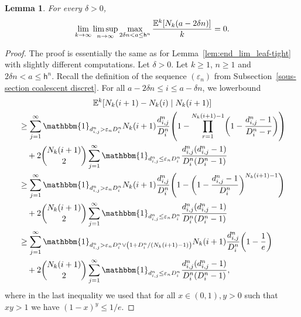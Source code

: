 \documentclass[10pt]{amsart}
\newtheorem{lemm}[theo]{Lemma}\newtheorem{prop}[theo]{Proposition}\newtheorem{coro}[theo]{Corollary}\newtheorem{conj}[theo]{Conjecture}
\theoremstyle{definition}\newtheorem{defi}[theo]{Definition}\newtheorem{rema}[theo]{Remark}\newtheorem{exam}[theo]{Example}\newtheorem{exem}[theo]{Example}\newtheorem{nota}[theo]{Notation}
\newcommand{\e}{\varepsilon}
\newcommand{\E}{\mathbb{E}}
\newcommand{\1}{\mathbbm{1}}
\newcommand{\h}{\mathsf{h}}
\let\originalleft\left
\let\originalright\right
\renewcommand{\left}{\mathopen{}\mathclose\bgroup\originalleft}
\renewcommand{\right}{\aftergroup\egroup\originalright}
\renewcommand*{\to}{\mathchoice{\longrightarrow}{\rightarrow}{\rightarrow}{\rightarrow}}
\begin{document}
\begin{lemm}\label{lemm4.5}
For every $\delta>0$,
\[
\lim_{k \to \infty} \limsup_{n \to \infty} \max_{2\delta n < a \le \h^n}\frac{\E^k[N_k(a-2\delta n)]}{k}= 0.
\]
\end{lemm}

\begin{proof}
The proof is essentially the same as for Lemma~\ref{lem:end_lim_leaf-tight} with slightly different computations. Let $\delta>0$. Let $k\ge 1$, $n\ge 1$ and $2\delta n < a \le \h^n$. Recall the definition of the sequence $(\e_n)$ from Subsection~\ref{sous-section coalescent discret}. For all $a- 2\delta n \le i \le a - \delta n$, we lowerbound
\begin{multline*}
\E^k \left[N_k(i+1) - N_k(i) \mid N_k(i+1)\right]\\
\begin{aligned}
&\ge \sum_{j=1}^\infty \1_{d^n_{i,j}>\e_n D^n_i} N_k(i+1)\frac{d^n_{i,j}}{D^n_i} \left(1 - \prod_{r=1}^{N_k(i+1)-1} \left(1- \frac{d^n_{i,j}-1}{D^n_i-r}\right)\right)
\\
&\quad + 2\binom{N_k(i+1)}{2} \sum_{j=1}^\infty \1_{d^n_{i,j} \le \e_n D^n_i} \frac{d^n_{i,j} (d^n_{i,j} -1)}{D^n_i(D^n_i-1)}\\
&\ge \sum_{j=1}^\infty \1_{d^n_{i,j}>\e_n D^n_i} N_k(i+1)\frac{d^n_{i,j}}{D^n_i} \left(1 - \left(1- \frac{d^n_{i,j}-1}{D^n_i}\right)^{N_k(i+1)-1}\right)\\
&\quad + 2\binom{N_k(i+1)}{2} \sum_{j=1}^\infty \1_{d^n_{i,j} \le \e_n D^n_i} \frac{d^n_{i,j} (d^n_{i,j} -1)}{D^n_i(D^n_i-1)}\\
&\ge \sum_{j=1}^\infty \1_{d^n_{i,j}>\e_n D^n_i \vee \left(1+ D^n_i/\left(N_k(i+1)-1\right)\right)} N_k(i+1) \frac{d^n_{i,j}}{D^n_i} \left(1-\frac{1}{e}\right) \\
&\quad + 2\binom{N_k(i+1)}{2} \sum_{j=1}^\infty \1_{d^n_{i,j} \le \e_n D^n_i} \frac{d^n_{i,j} (d^n_{i,j} -1)}{D^n_i(D^n_i-1)},
\end{aligned}
\end{multline*}
where in the last inequality we used that for all $x\in (0,1),y>0$ such that $xy>1$ we have $(1-x)^y\leq 1/e$.


\end{proof}
\end{document}
